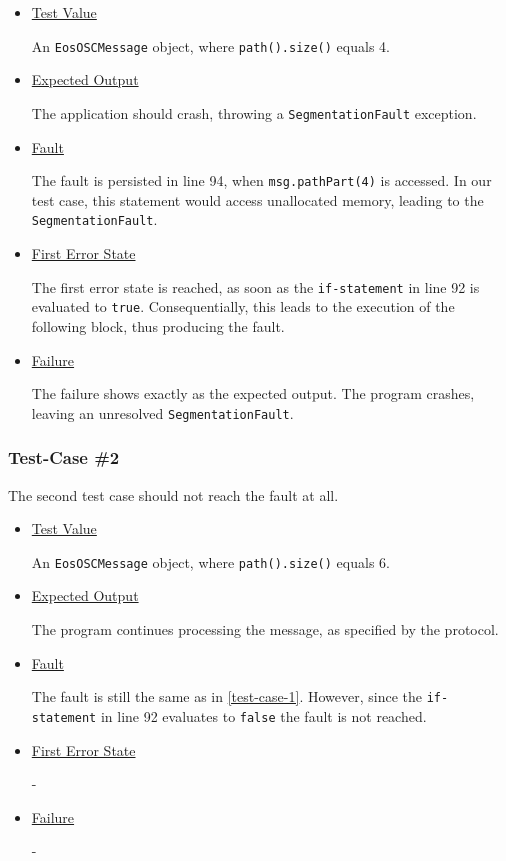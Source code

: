 \documentclass{scrreprt}
\begin{document}
\begin{itemize}
	\item[] \underline{Test Value}
	
	An \texttt{EosOSCMessage} object, where \texttt{path().size()} equals 4.
	
	\item[] \underline{Expected Output}
	
	The application should crash, throwing a \texttt{SegmentationFault} exception.
	
	\item[] \underline{Fault}
	
	The fault is persisted in line 94, when \texttt{msg.pathPart(4)} is accessed. In our test case, this statement would access unallocated memory, leading to the \texttt{SegmentationFault}.
	
	\item[] \underline{First Error State}
	
	The first error state is reached, as soon as the \texttt{if-statement} in line 92 is evaluated to \texttt{true}. Consequentially, this leads to the execution of the following block, thus producing the fault.
	
	\item[] \underline{Failure}
	
	The failure shows exactly as the expected output. The program crashes, leaving an unresolved \texttt{SegmentationFault}.
\end{itemize}

\subsubsection{Test-Case \#2}
\label{test-case-2}

The second test case should not reach the fault at all.

\begin{itemize}
	\item[] \underline{Test Value}
	
	An \texttt{EosOSCMessage} object, where \texttt{path().size()} equals 6.
	
	\item[] \underline{Expected Output}
	
	The program continues processing the message, as specified by the protocol.
	
	\item[] \underline{Fault}
	
	The fault is still the same as in \vref{test-case-1}. However, since the \texttt{if-statement} in line 92 evaluates to \texttt{false} the fault is not reached.
	
	\item[] \underline{First Error State}
	
	-
	
	\item[] \underline{Failure}
	
	-
\end{itemize}
\end{document}
